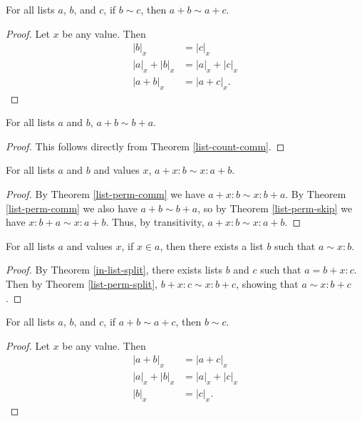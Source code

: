 \documentclass[../math.tex]{subfiles}
\begin{document}
\begin{theorem} \label{list-perm-rpart}
    For all lists $a$, $b$, and $c$, if $b \sim c$, then $a + b \sim a + c$.
\end{theorem}
\begin{proof}
    Let $x$ be any value.  Then
    \begin{align*}
        |b|_x &= |c|_x \\
        |a|_x + |b|_x &= |a|_x + |c|_x \\
        |a + b|_x &= |a + c|_x.
    \end{align*}
\end{proof}

\begin{theorem} \label{list-perm-comm}
    For all lists $a$ and $b$, $a + b \sim b + a$.
\end{theorem}
\begin{proof}
    This follows directly from Theorem \ref{list-count-comm}.
\end{proof}

\begin{theorem} \label{list-perm-split}
    For all lists $a$ and $b$ and values $x$, $a + x : b \sim x : a + b$.
\end{theorem}
\begin{proof}
    By Theorem \ref{list-perm-comm} we have $a + x : b \sim x : b + a$.  By
    Theorem \ref{list-perm-comm} we also have $a + b \sim b + a$, so by Theorem
    \ref{list-perm-skip} we have $x : b + a \sim x : a + b$.  Thus, by
    transitivity, $a + x : b \sim x : a + b$.
\end{proof}

\begin{theorem} \label{list-split-perm}
    For all lists $a$ and values $x$, if $x \in a$, then there exists a list $b$
    such that $a \sim x : b$.
\end{theorem}
\begin{proof}
    By Theorem \ref{in-list-split}, there exists lists $b$ and $c$ such that $a
    = b + x : c$.  Then by Theorem \ref{list-perm-split}, $b + x : c \sim x : b
    + c$, showing that $a \sim x : b + c$.
\end{proof}

\begin{theorem} \label{list-perm-conc-lcancel}
    For all lists $a$, $b$, and $c$, if $a + b \sim a + c$, then $b \sim c$.
\end{theorem}
\begin{proof}
    Let $x$ be any value.  Then
    \begin{align*}
        |a + b|_x &= |a + c|_x \\
        |a|_x + |b|_x &= |a|_x + |c|_x \\
        |b|_x &= |c|_x.
    \end{align*}
\end{proof}
\end{document}
